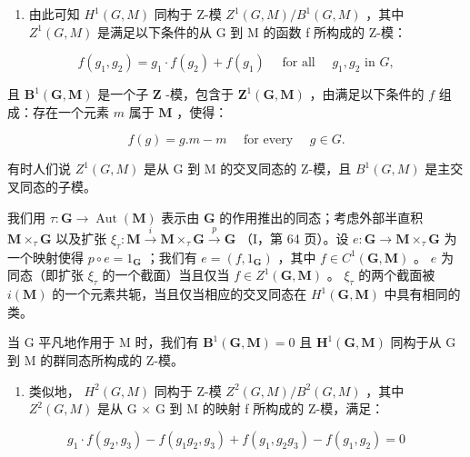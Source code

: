 \begin{enumerate}
\def\labelenumi{\arabic{enumi})}
\setcounter{enumi}{1}
\tightlist
\item
  由此可知 \(H^{1}(G, M)\) 同构于 Z-模 \(Z^{1}(G, M)/B^{1}(G, M)\) ，其中 \(Z^{1}(G, M)\) 是满足以下条件的从 G 到 M 的函数 f 所构成的 Z-模：
\end{enumerate}

\[
f \left(g _ {1}, g _ {2}\right) = g _ {1} \cdot f \left(g _ {2}\right) + f \left(g _ {1}\right) \quad \text { for   all } \quad g _ {1}, g _ {2} \text { in } G,
\]

且 \(\mathbf{B}^{1}(\mathbf{G},\mathbf{M})\) 是一个子 \(\mathbf{Z}\) -模，包含于 \(\mathbf{Z}^{1}(\mathbf{G},\mathbf{M})\) ，由满足以下条件的 \(f\) 组成：存在一个元素 \(m\) 属于 \(\mathbf{M}\) ，使得：

\[
f (g) = g. m - m \quad \text { for   every } \quad g \in G.
\]

有时人们说 \(Z^{1}(G, M)\) 是从 G 到 M 的交叉同态的 Z-模，且 \(B^{1}(G, M)\) 是主交叉同态的子模。

我们用 \(\tau: \mathbf{G} \to \operatorname{Aut}(\mathbf{M})\) 表示由 \(\mathbf{G}\) 的作用推出的同态；考虑外部半直积 \(\mathbf{M} \times_{\tau} \mathbf{G}\) 以及扩张 \(\xi_{\tau}: \mathbf{M} \xrightarrow{i} \mathbf{M} \times_{\tau} \mathbf{G} \xrightarrow{p} \mathbf{G}\) （I，第 64 页）。设 \(e: \mathbf{G} \to \mathbf{M} \times_{\tau} \mathbf{G}\) 为一个映射使得 \(p \circ e = 1_{\mathbf{G}}\) ；我们有 \(e = (f, 1_{\mathbf{G}})\) ，其中 \(f \in C^{1}(\mathbf{G}, \mathbf{M})\) 。 \(e\) 为同态（即扩张 \(\xi_{\tau}\) 的一个截面）当且仅当 \(f \in Z^{1}(\mathbf{G}, \mathbf{M})\) 。 \(\xi_{\tau}\) 的两个截面被 \(i(\mathbf{M})\) 的一个元素共轭，当且仅当相应的交叉同态在 \(H^{1}(\mathbf{G}, \mathbf{M})\) 中具有相同的类。

当 G 平凡地作用于 M 时，我们有 \(\mathbf{B}^{1}(\mathbf{G},\mathbf{M})=0\) 且 \(\mathbf{H}^{1}(\mathbf{G},\mathbf{M})\) 同构于从 G 到 M 的群同态所构成的 Z-模。

\begin{enumerate}
\def\labelenumi{\arabic{enumi})}
\setcounter{enumi}{2}
\tightlist
\item
  类似地， \(H^{2}(G, M)\) 同构于 Z-模 \(Z^{2}(G, M)/B^{2}(G, M)\) ，其中 \(Z^{2}(G, M)\) 是从 G × G 到 M 的映射 f 所构成的 Z-模，满足：
\end{enumerate}

\[
g _ {1} \cdot f (g _ {2}, g _ {3}) - f (g _ {1} g _ {2}, g _ {3}) + f (g _ {1}, g _ {2} g _ {3}) - f (g _ {1}, g _ {2}) = 0
\]

